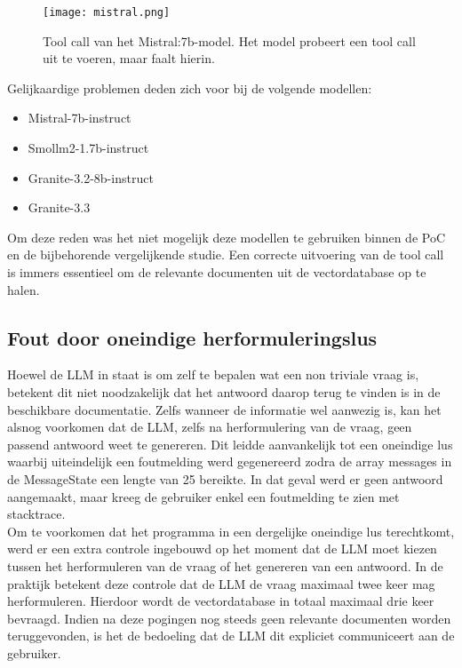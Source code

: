 \begin{figure}[H]
    \texttt{[image: mistral.png]}
    \caption{Tool call van het Mistral:7b-model. Het model probeert een tool call uit te voeren, maar faalt hierin.}
    \label{fig:tool_call_Mistral}
\end{figure}

Gelijkaardige problemen deden zich voor bij de volgende modellen:
\begin{itemize}
    \item Mistral-7b-instruct
    \item Smollm2-1.7b-instruct
    \item Granite-3.2-8b-instruct
    \item Granite-3.3
\end{itemize}

Om deze reden was het niet mogelijk deze modellen te gebruiken binnen de PoC en de bijbehorende vergelijkende studie. Een correcte uitvoering van de tool call is immers essentieel om de relevante documenten uit de vectordatabase op te halen.

\subsection{Fout door oneindige herformuleringslus}

Hoewel de LLM in staat is om zelf te bepalen wat een non triviale vraag is, betekent dit niet noodzakelijk dat het antwoord daarop terug te vinden is in de beschikbare documentatie. Zelfs wanneer de informatie wel aanwezig is, kan het alsnog voorkomen dat de LLM, zelfs na herformulering van de vraag, geen passend antwoord weet te genereren. Dit leidde aanvankelijk tot een oneindige lus waarbij uiteindelijk een foutmelding werd gegenereerd zodra de array messages in de MessageState een lengte van 25 bereikte. In dat geval werd er geen antwoord aangemaakt, maar kreeg de gebruiker enkel een foutmelding te zien met stacktrace.
\\[1em]
Om te voorkomen dat het programma in een dergelijke oneindige lus terechtkomt, werd er een extra controle ingebouwd op het moment dat de LLM moet kiezen tussen het herformuleren van de vraag of het genereren van een antwoord. In de praktijk betekent deze controle dat de LLM de vraag maximaal twee keer mag herformuleren. Hierdoor wordt de vectordatabase in totaal maximaal drie keer bevraagd. Indien na deze pogingen nog steeds geen relevante documenten worden teruggevonden, is het de bedoeling dat de LLM dit expliciet communiceert aan de gebruiker. 

